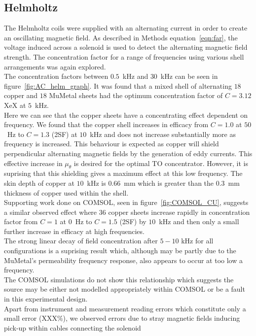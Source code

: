 \documentclass[11pt]{iopart}
\begin{document}
\subsection{Helmholtz}
The Helmholtz coils were supplied with an alternating current in order
to create an oscillating magnetic field.  As described in Methods
equation~\ref{eqn:far}, the voltage induced across a solenoid is used
to detect the alternating magnetic field strength. The concentration
factor for a range of frequencies using various shell arrangements was
again explored.\\
The concentration factors between $0.5$~kHz and $30$~kHz can be seen
in figure~\ref{fig:AC_helm_graph}. It was found that a mixed shell of
alternating $18$ copper and $18$ MuMetal sheets had the optimum
concentration factor of $C = 3.12$ XeX at $5$~kHz.\\ Here we can see
that the copper sheets have a concentrating effect dependent on
frequency.  We found that the copper shell increases in efficacy from
$C = 1.0$ at $50$~Hz to $C = 1.3$ (2SF) at $10$~kHz and does not
increase substantially more as frequency is increased.  This behaviour
is expected as copper will shield perpendicular alternating magnetic
fields by the generation of eddy currents. This effective increase in
$\mu_\theta$ is desired for the optimal TO concentrator. However, it
is suprising that this shielding gives a maximum effect at this low
frequency. The skin depth of copper at $10$~kHz is $0.66$~mm which is
greater than the $0.3$~mm thickness of copper used within the
shell.\\ Supporting work done on COMSOL, seen in
figure~\ref{fig:COMSOL_CU}, suggests a similar observed effect where
36 copper sheets increase rapidly in concentration factor from $C = 1$
at $0$~Hz to $C = 1.5$ (2SF) by $10$~kHz and then only a small further
increase in efficacy at high frequencies.\\
The strong linear decay of field concentration after $5-10$ kHz for
all configurations is a suprising result which, although may be partly
due to the MuMetal's permeability frequency response, also appears to
occur at too low a frequency.\\ The COMSOL simulations do not show
this relationship which suggests the source may be either not modelled
appropriately within COMSOL or be a fault in this experimental
design.\\ Apart from instrument and measurement reading errors which
constitute only a small error (XXX\%), we observed errors due to stray
magnetic fields inducing pick-up within cables connecting the solenoid
\end{document}
